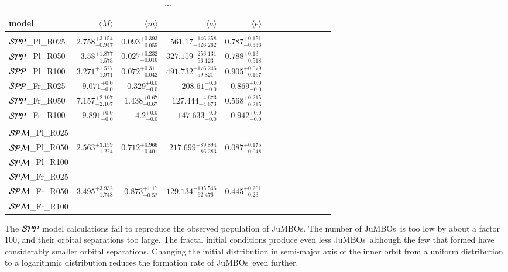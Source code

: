 \documentclass[aa]{lib/aa}
\newcommand{\jumbos}{\mbox{JuMBOs}}
\begin{document}
\begin{table}
 \caption{...}
 \label{Tab:model_PP}
 \centering 
 \begin{tabular}{lrrrrrrrrrrrr}
 \hline\hline
model & $\langle M \rangle$ & $\langle m \rangle$ & $\langle a \rangle$ & $\langle e \rangle$ \\
        \hline \vspace{-0.75em}\\
${\cal SPP}$\_Pl\_R025 & $2.758^{+3.154}_{-0.947}$ & $0.093^{+0.393}_{-0.055}$ & $561.17^{+146.358}_{-326.262}$ & $0.787^{+0.151}_{-0.336}$ \\
${\cal SPP}$\_Pl\_R050 & $3.58^{+1.877}_{-1.573}$ & $0.027^{+0.232}_{-0.016}$ & $327.159^{+256.131}_{-56.123}$ & $0.788^{+0.13}_{-0.518}$ \\
${\cal SPP}$\_Pl\_R100 & $3.271^{+1.527}_{-1.971}$ & $0.072^{+0.31}_{-0.042}$ & $491.732^{+176.246}_{-99.821}$ & $0.905^{+0.079}_{-0.167}$ \\
${\cal SPP}$\_Fr\_R025 & $9.071^{+0.0}_{-0.0}$ & $0.329^{+0.0}_{-0.0}$ & $208.61^{+0.0}_{-0.0}$ & $0.869^{+0.0}_{-0.0}$ \\
${\cal SPP}$\_Fr\_R050 & $7.157^{+2.107}_{-2.107}$ & $1.438^{+0.67}_{-0.67}$ & $127.444^{+4.673}_{-4.673}$ & $0.568^{+0.215}_{-0.215}$ \\
${\cal SPP}$\_Fr\_R100 & $9.891^{+0.0}_{-0.0}$ & $4.2^{+0.0}_{-0.0}$ & $147.633^{+0.0}_{-0.0}$ & $0.942^{+0.0}_{-0.0}$ \\
  \hline \vspace{-0.75em} \\ 
${\cal SPM}$\_Pl\_R025 &    \\
${\cal SPM}$\_Pl\_R050 & $2.563^{+3.159}_{-1.224}$ & $0.712^{+0.966}_{-0.401}$ & $217.699^{+89.894}_{-86.283}$ & $0.087^{+0.175}_{-0.048}$ \\
${\cal SPM}$\_Pl\_R100 &     \\
${\cal SPM}$\_Fr\_R025 &     \\
${\cal SPM}$\_Fr\_R050 & $3.495^{+3.932}_{-1.748}$ & $0.873^{+1.17}_{-0.52}$ & $129.134^{+105.546}_{-62.476}$ & $0.445^{+0.261}_{-0.23}$ \\
${\cal SPM}$\_Fr\_R100 &     \\
  \hline
 \end{tabular}
\end{table}




The ${\cal SPP}$ model calculations fail to reproduce the observed
population of \jumbos. The number of \jumbos\, is too low by about a
factor 100, and their orbital separations too large.  The fractal
initial conditions produce even less \jumbos\, although the few that
formed have considerably smaller orbital separations.  Changing the
initial distribution in semi-major axis of the inner orbit from a
uniform distribution to a logarithmic distribution reduces the
formation rate of \jumbos\, even further.
\end{document}

